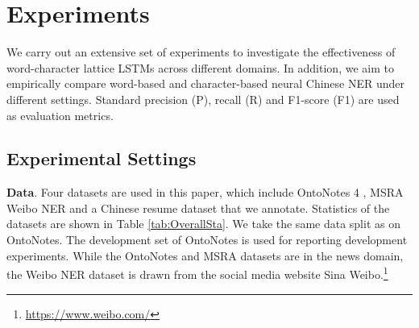 \documentclass[11pt,a4paper]{article}
\begin{document}
\begin{CJK*}{UTF8}{gbsn}
\begin{table}[!tp]
\begin{center}
\end{center}
\caption{Statistics of datasets.}
\label{tab:OverallSta}
\end{table}



\section{Experiments} 
We carry out an extensive set of experiments to investigate the effectiveness of word-character lattice LSTMs across different domains. In addition, we aim to empirically compare word-based and character-based neural Chinese NER under different settings. Standard precision (P), recall (R) and F1-score (F1) are used as evaluation metrics.

\subsection{Experimental Settings}
\textbf{Data}. Four datasets are used in this paper, which include OntoNotes 4 \cite{weischedel2011ontonotes}, MSRA \cite{levow2006third} Weibo NER \cite{peng2015named,he2017f} and a Chinese resume dataset that we annotate. Statistics of the datasets are shown in Table \ref{tab:OverallSta}. We take the same data split as \citet{che2013named} on OntoNotes. The development set of OntoNotes is used for reporting development experiments. While the OntoNotes and MSRA datasets are in the news domain, the Weibo NER dataset is drawn from the social media website Sina Weibo.\footnote{\url{https://www.weibo.com/}}


\end{CJK*}
\end{document}
